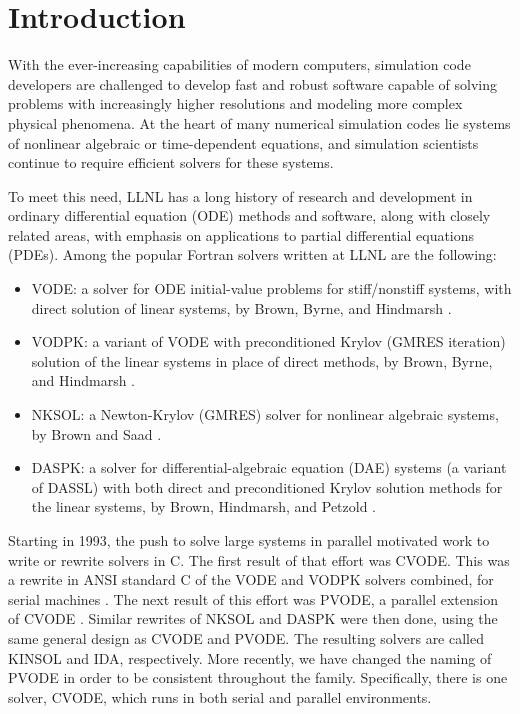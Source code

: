 \section{Introduction}

With the ever-increasing capabilities of modern computers, simulation 
code developers are challenged to develop fast and robust software 
capable of solving problems with increasingly higher resolutions and 
modeling more complex 
physical phenomena.  At the heart of many numerical simulation codes
lie systems of nonlinear algebraic or time-dependent equations, and 
simulation scientists continue to require efficient solvers for these 
systems.  

To meet this need, LLNL has a long history of research and 
development in ordinary
differential equation (ODE) methods and software, along with closely related
areas, with emphasis on applications to partial differential equations
(PDEs).  Among the popular Fortran solvers written at LLNL are the
following:
\begin{itemize}
\item VODE: a solver for ODE initial-value problems for stiff/nonstiff
systems, with direct solution of linear systems, by Brown, Byrne, and
Hindmarsh \cite{BBH:89}.
\item VODPK: a variant of VODE with preconditioned Krylov (GMRES
iteration) solution of the linear systems in place of direct methods,
by Brown, Byrne, and Hindmarsh \cite{Byr:92}.
\item NKSOL: a Newton-Krylov (GMRES) solver for nonlinear algebraic
systems, by Brown and Saad \cite{BrSa:90}.
\item DASPK: a solver for differential-algebraic equation (DAE)
systems (a variant of DASSL) with both direct and preconditioned
Krylov solution methods for the linear systems, by Brown, Hindmarsh,
and Petzold \cite{BHP:94}.
\end{itemize}
Starting in 1993, the push to solve large systems in parallel
motivated work to write or rewrite solvers in C.  The first result of
that effort was CVODE.  This was a rewrite in ANSI standard C of the
VODE and VODPK solvers combined, for serial machines
\cite{CoHi:94,CoHi:96}.  The next result of this effort was PVODE, a
parallel extension of CVODE \cite{ByHi:98,ByHi:99}.
Similar rewrites of NKSOL and DASPK were then done, using the same
general design as CVODE and PVODE.  The resulting solvers are called
KINSOL and IDA, respectively.
More recently, we have changed the naming of PVODE in order
to be consistent throughout the family.  Specifically, there is
one solver, CVODE, which runs in both serial and parallel environments. 

